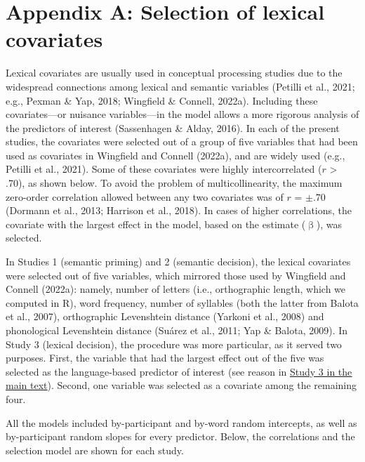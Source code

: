\documentclass[
  12pt,
  man,floatsintext]{apa7}
\renewcommand\appendix{}
\begin{document}
\newpage

\hypertarget{appendix-appendix}{%
\appendix}


\renewcommand{\thefigure}{A\arabic{figure}} \setcounter{figure}{0}
\renewcommand{\thetable}{A\arabic{table}} \setcounter{table}{0}

\hypertarget{appendix-A-lexical-covariates}{%
\section{Appendix A: Selection of lexical covariates}\label{appendix-A-lexical-covariates}}

Lexical covariates are usually used in conceptual processing studies due to the widespread connections among lexical and semantic variables (Petilli et al., 2021; e.g., Pexman \& Yap, 2018; Wingfield \& Connell, 2022a). Including these covariates---or nuisance variables---in the model allows a more rigorous analysis of the predictors of interest (Sassenhagen \& Alday, 2016). In each of the present studies, the covariates were selected out of a group of five variables that had been used as covariates in Wingfield and Connell (2022a), and are widely used (e.g., Petilli et al., 2021). Some of these covariates were highly intercorrelated (\(r\) \textgreater{} .70), as shown below. To avoid the problem of multicollinearity, the maximum zero-order correlation allowed between any two covariates was of \(r\) = \(\pm\).70 (Dormann et al., 2013; Harrison et al., 2018). In cases of higher correlations, the covariate with the largest effect in the model, based on the estimate (\(\upbeta\)), was selected.

In Studies 1 (semantic priming) and 2 (semantic decision), the lexical covariates were selected out of five variables, which mirrored those used by Wingfield and Connell (2022a): namely, number of letters (i.e., orthographic length, which we computed in R), word frequency, number of syllables (both the latter from Balota et al., 2007), orthographic Levenshtein distance (Yarkoni et al., 2008) and phonological Levenshtein distance (Suárez et al., 2011; Yap \& Balota, 2009). In Study 3 (lexical decision), the procedure was more particular, as it served two purposes. First, the variable that had the largest effect out of the five was selected as the language-based predictor of interest (see reason in \protect\hyperlink{lexicaldecision}{\underline{Study 3 in the main text}}). Second, one variable was selected as a covariate among the remaining four.

All the models included by-participant and by-word random intercepts, as well as by-participant random slopes for every predictor. Below, the correlations and the selection model are shown for each study.
\end{document}
